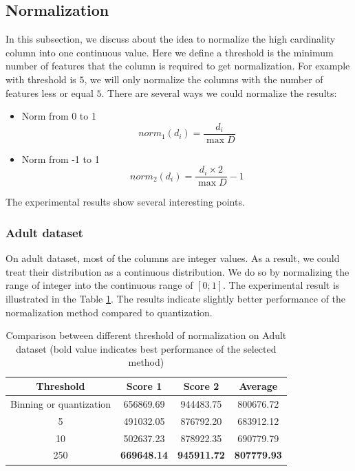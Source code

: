 \documentclass{article}
\begin{document}
\subsection{Normalization}

In this subsection, we discuss about the idea to normalize the high cardinality column into one continuous value. Here we define a threshold is the minimum number of features that the column is required to get normalization. For example with threshold is $5$, we will only normalize the columns with the number of features less or equal $5$. There are several ways we could normalize the results:

\begin{itemize}
	\item Norm from 0 to 1
		\begin{equation}
		norm_1(d_i) = \frac{d_i}{\max D}
		\end{equation}
	\item Norm from -1 to 1
		\begin{equation}
		norm_2(d_i) = \frac{d_i \times 2}{\max D} -1
		\end{equation}
		
\end{itemize}

 
 The experimental results show several interesting points. 

\subsubsection{Adult dataset}

On adult dataset, most of the columns are integer values. As a result, we could treat their distribution as a continuous distribution. We do so by normalizing the range of integer into the continuous range of $[0; 1]$. The experimental result is illustrated in the Table \ref{tab:normadult}. The results indicate slightly better performance of the normalization method compared to quantization.

\begin{table}[htpb]\centering
	\begin{tabular}{cccc}
		\hline
		\textbf{Threshold}      & \textbf{Score 1}   & \textbf{Score 2}   & \textbf{Average}   \\ \hline
		Binning or quantization & 656869.69          & 944483.75          & 800676.72          \\ \hline
		5                       & 491032.05          & 876792.20          & 683912.12          \\ \hline
		10                      & 502637.23          & 878922.35          & 690779.79          \\ \hline
		250                     & \textbf{669648.14} & \textbf{945911.72} & \textbf{807779.93} \\ \hline
	\end{tabular}
\caption{Comparison between different threshold of normalization on Adult dataset (bold value indicates best performance of the selected method)}
\label{tab:normadult}
\end{table}
\end{document}
